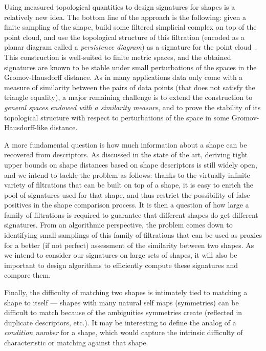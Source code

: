 Using measured topological quantities to design signatures for shapes
is a relatively new idea. The bottom line of the approach is the
following: given a finite sampling of the shape, build some filtered
simplicial complex on top of the point cloud, and use the topological
structure of this filtration (encoded as a planar diagram called a
{\em persistence diagram}) as a signature for the point
cloud~\cite{ccgmo-ghsssp-09, socg-pbsds-10}. This construction is
well-suited to finite metric spaces, and the obtained signatures are
known to be stable under small perturbations of the spaces in the
Gromov-Hausdorff distance.  
As in many applications data only come with a measure of similarity between the pairs of data points  (that does not satisfy the triangle equality), 
a major remaining challenge is to extend the construction to {\em general spaces endowed with a similarity measure},
and to prove the stability of
its topological structure with respect to perturbations of the space
in some Gromov-Hausdorff-like distance.

A more fundamental question is how much information about a shape can
be recovered from descriptors. As discussed in the state of the art,
deriving tight upper bounds on shape distances based on shape descriptors is
still widely open, and we intend to tackle the problem as
follows: thanks to the virtually infinite variety of filtrations that
can be built on top of a shape, it is easy to enrich the pool of
signatures used for that shape, and thus restrict the possibility of
false positives in the shape comparison process. It is then a question
of how large a family of filtrations is required to guarantee that
different shapes do get different signatures. From an algorithmic
perspective, the problem comes down to identifying small samplings of this
family of filtrations that can be used as proxies for a better (if not
perfect) assessment of the similarity between two shapes.  As we
intend to consider our signatures on large sets of shapes, it will
also be important to design algorithms to efficiently compute these
signatures and compare them.%

Finally, the difficulty of matching two shapes is
intimately tied to matching a shape to itself --- shapes with many
natural self maps (symmetries) can be difficult to match because of
the ambiguities symmetries create (reflected in duplicate descriptors,
etc.). It may be interesting to define the analog of a {\em condition
  number} for a shape, which would capture the intrinsic difficulty of
characteristic or matching against that shape.



